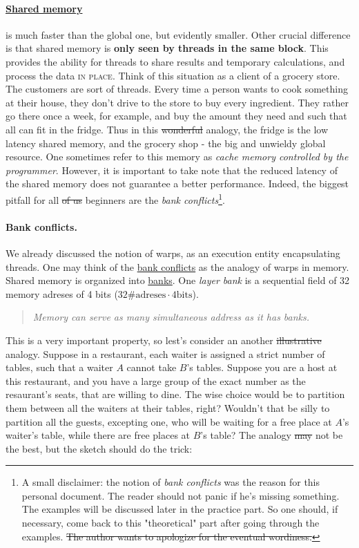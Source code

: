 \documentclass[12pt]{article}
\begin{document}
\vspace{-15pt}
\paragraph{\underline{Shared memory}} \label{grocery_store} is much faster than the global one, but evidently smaller. Other 
crucial difference is that shared memory is \textbf{only seen by threads in the same block}. This provides 
the ability for threads to share results and temporary calculations, and process the data \textsc{in place}. 
Think of this situation as a client of a grocery store. The customers are sort of threads. Every time a person 
wants to cook something at their house, they don't drive to the store to buy every ingredient. They rather go there 
once a week, for example, and buy the amount they need and such that all can fit in the fridge. Thus 
in this \sout{wonderful} analogy, the fridge is the low latency shared memory, and the grocery shop - the 
big and unwieldy global resource.
One sometimes refer to this memory as 
\textsl{cache memory controlled by the programmer}. However, it is important to take note that the reduced 
latency of the shared memory does not guarantee a better performance. Indeed, the biggest pitfall for all \sout{of us} beginners 
are the \textit{bank conflicts}\footnote{A small disclaimer: the notion of \textit{bank conflicts} was the reason for this personal 
document. The reader should not panic if he's missing something. The examples will be discussed later in the practice part. So one 
should, if necessary, come back to this "theoretical" part after going through the examples. \sout{The author wants to apologize 
for the eventual wordiness.}}. 

\paragraph{Bank conflicts.}We already discussed the notion of warps, as an execution entity encapsulating threads. 
One may think of the \underline{bank conflicts} as the analogy of warps in memory. Shared memory is organized into \underline{banks}.
One \textit{layer bank} is a sequential field of 32 memory adreses of 4 bits ($32\text{\#adreses}\cdot 4\text{bits}$). 

\begin{quote}
   \textsl{Memory can serve as many simultaneous address as it has banks.} 
\end{quote}
This is a very important property, so lest's consider an another \sout{illustrative} analogy. Suppose in a restaurant, each waiter 
is assigned a strict number of tables, such that a waiter $A$ cannot take $B$'s tables. Suppose you are a host at this restaurant, 
and you have a large group of the exact number as the resaurant's seats, that are willing to dine. The wise choice would be to 
partition them between all the waiters at their tables, right? Wouldn't that be silly to partition all the guests, excepting one, 
who will be waiting for a free place at $A$'s waiter's table, while there are free places at $B$'s table? The analogy \sout{may} not be 
the best, but the sketch should do the trick: 
\end{document}
